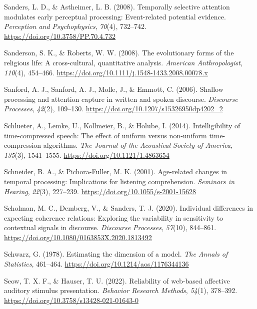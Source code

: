 \documentclass[a4paper, nobind]{templates/ociamthesis}
\newlength{\cslhangindent}
\newenvironment{CSLReferences}[2] %
 {%
  \setlength{\parindent}{0pt}
  \ifodd #1
  \let\oldpar\par
  \def\par{\hangindent=\cslhangindent\oldpar}
  \fi
  \setlength{\parskip}{1mm}
  \setlength{\baselineskip}{6mm}
 }%
 {}
\begin{document}
\begin{CSLReferences}{1}{0}
\leavevmode{}%
Sanders, L. D., \& Astheimer, L. B. (2008). {Temporally selective attention modulates early perceptual processing: Event-related potential evidence}. \emph{Perception and Psychophysics}, \emph{70}(4), 732--742. \url{https://doi.org/10.3758/PP.70.4.732}

\leavevmode{}%
Sanderson, S. K., \& Roberts, W. W. (2008). {The evolutionary forms of the religious life: A cross-cultural, quantitative analysis}. \emph{American Anthropologist}, \emph{110}(4), 454--466. \url{https://doi.org/10.1111/j.1548-1433.2008.00078.x}

\leavevmode{}%
Sanford, A. J., Sanford, A. J., Molle, J., \& Emmott, C. (2006). Shallow processing and attention capture in written and spoken discourse. \emph{Discourse Processes}, \emph{42}(2), 109--130. \url{https://doi.org/10.1207/s15326950dp4202_2}

\leavevmode{}%
Schlueter, A., Lemke, U., Kollmeier, B., \& Holube, I. (2014). {Intelligibility of time-compressed speech: The effect of uniform versus non-uniform time-compression algorithms}. \emph{The Journal of the Acoustical Society of America}, \emph{135}(3), 1541--1555. \url{https://doi.org/10.1121/1.4863654}

\leavevmode{}%
Schneider, B. A., \& Pichora-Fuller, M. K. (2001). Age-related changes in temporal processing: Implications for listening comprehension. \emph{Seminars in Hearing}, \emph{22}(3), 227--239. \url{https://doi.org/10.1055/s-2001-15628}

\leavevmode{}%
Scholman, M. C., Demberg, V., \& Sanders, T. J. (2020). Individual differences in expecting coherence relations: Exploring the variability in sensitivity to contextual signals in discourse. \emph{Discourse Processes}, \emph{57}(10), 844--861. \url{https://doi.org/10.1080/0163853X.2020.1813492}

\leavevmode{}%
Schwarz, G. (1978). Estimating the dimension of a model. \emph{The Annals of Statistics}, 461--464. \url{https://doi.org/10.1214/aos/1176344136}

\leavevmode{}%
Seow, T. X. F., \& Hauser, T. U. (2022). {Reliability of web-based affective auditory stimulus presentation}. \emph{Behavior Research Methods}, \emph{54}(1), 378--392. \url{https://doi.org/10.3758/s13428-021-01643-0}


\end{CSLReferences}
\end{document}
